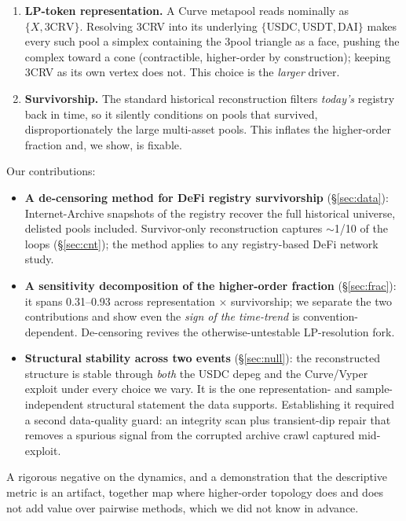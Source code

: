 \documentclass[10pt,twocolumn]{article}
\newcommand{\num}[1]{#1}
\begin{document}
\begin{enumerate}
\item \textbf{LP-token representation.} A Curve metapool reads nominally as
$\{X, \text{3CRV}\}$. Resolving 3CRV into its underlying $\{$USDC,\,USDT,\,DAI$\}$ makes
every such pool a simplex containing the 3pool triangle as a face, pushing the complex
toward a cone (contractible, higher-order by construction); keeping 3CRV as its own vertex
does not. This choice is the \emph{larger} driver.
\item \textbf{Survivorship.} The standard historical reconstruction filters
\emph{today's} registry back in time, so it silently conditions on pools that survived,
disproportionately the large multi-asset pools. This inflates the higher-order fraction
and, we show, is fixable.
\end{enumerate}

Our contributions:
\begin{itemize}
\item \textbf{A de-censoring method for DeFi registry survivorship} (\S\ref{sec:data}):
Internet-Archive snapshots of the registry recover the full historical universe,
delisted pools included. Survivor-only reconstruction captures $\sim$1/10 of the loops
(\S\ref{sec:cnt}); the method applies to any registry-based DeFi network study.
\item \textbf{A sensitivity decomposition of the higher-order fraction}
(\S\ref{sec:frac}): it spans \num{0.31}--\num{0.93} across representation $\times$
survivorship; we separate the two contributions and show even the \emph{sign of the
time-trend} is convention-dependent. De-censoring revives the otherwise-untestable
LP-resolution fork.
\item \textbf{Structural stability across two events} (\S\ref{sec:null}): the reconstructed
structure is stable through \emph{both} the USDC depeg and the Curve/Vyper exploit under
every choice we vary. It is the one representation- and sample-independent structural
statement the data supports. Establishing it required a second data-quality guard: an integrity scan
plus transient-dip repair that removes a spurious signal from the corrupted archive crawl
captured mid-exploit.
\end{itemize}

A rigorous negative on the dynamics, and a demonstration that the descriptive metric is an
artifact, together map where higher-order topology does and does not add value over
pairwise methods, which we did not know in advance.
\end{document}
